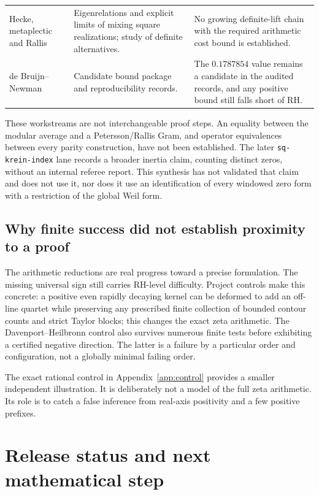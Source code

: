 \documentclass[11pt,letterpaper]{article}
\theoremstyle{definition}
\theoremstyle{remark}
\numberwithin{equation}{section}
\begin{document}
\begin{longtable}{>{\raggedright\arraybackslash}p{}>{\raggedright\arraybackslash}p{}>{\raggedright\arraybackslash}p{}}
Hecke, metaplectic and Rallis & Eigenrelations and explicit limits of mixing square realizations; study of definite alternatives. & No growing definite-lift chain with the required arithmetic cost bound is established.\\
de Bruijn--Newman & Candidate bound package and reproducibility records. & The $0.1787854$ value remains a candidate in the audited records, and any positive bound still falls short of RH.\\
\bottomrule
\end{longtable}

These workstreams are not interchangeable proof steps. An equality between the modular average and a Petersson/Rallis Gram, and operator equivalences between every parity construction, have not been established. The later \texttt{sq-krein-index} lane records a broader inertia claim, counting distinct zeros, without an internal referee report. This synthesis has not validated that claim and does not use it, nor does it use an identification of every windowed zero form with a restriction of the global Weil form.

\subsection{Why finite success did not establish proximity to a proof}
The arithmetic reductions are real progress toward a precise formulation. The missing universal sign still carries RH-level difficulty. Project controls make this concrete: a positive even rapidly decaying kernel can be deformed to add an off-line quartet while preserving any prescribed finite collection of bounded contour counts and strict Taylor blocks; this changes the exact zeta arithmetic. The Davenport--Heilbronn control also survives numerous finite tests before exhibiting a certified negative direction. The latter is a failure by a particular order and configuration, not a globally minimal failing order.

The exact rational control in Appendix~\ref{app:control} provides a smaller independent illustration. It is deliberately not a model of the full zeta arithmetic. Its role is to catch a false inference from real-axis positivity and a few positive prefixes.

\section{Release status and next mathematical step}
\end{document}
